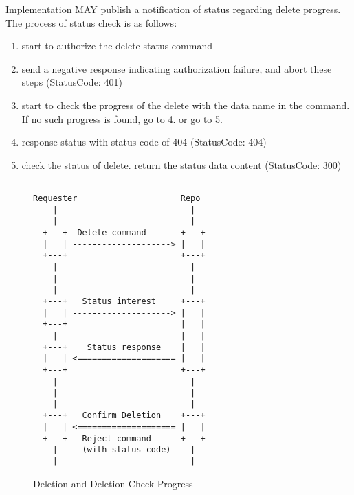 \documentclass{acm_proc_article-sp}
\begin{document}
Implementation MAY publish a notification of status regarding delete progress. The process of status check is as follows:

\begin{enumerate}

\item start to authorize the delete status command

\item send a negative response indicating authorization failure, and abort these steps (StatusCode: 401)

\item start to check the progress of the delete with the data name in the command. If no such progress is found, go to 4. or go to 5.

\item response status with status code of 404 (StatusCode: 404)

\item check the status of delete. return the status data content (StatusCode: 300)

\end{enumerate}

\begin{figure*}
\centering
\begin{BVerbatim}

Requester                     Repo 
    |                           |                                 
    |                           |                                 
  +---+  Delete command       +---+                               
  |   | --------------------> |   |                               
  +---+                       +---+                               
    |                           |                                 
    |                           |                                 
    |                           |                                 
  +---+   Status interest     +---+                               
  |   | --------------------> |   |                               
  +---+                       |   |                               
    |                         |   |                               
  +---+    Status response    |   |                               
  |   | <==================== |   |                               
  +---+                       +---+                               
    |                           |                                 
    |                           |                                 
    |                           |                                 
  +---+   Confirm Deletion    +---+                               
  |   | <==================== |   |                               
  +---+   Reject command      +---+                               
    |     (with status code)    |    
    |                           |

\end{BVerbatim}
\caption{Deletion and Deletion Check Progress}
\end{figure*}
\end{document}
